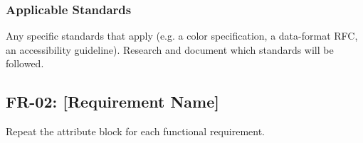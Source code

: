 \subsubsection{Applicable Standards}
Any specific standards that apply (e.g. a color specification, a data-format RFC, an accessibility guideline). Research and document which standards will be followed.

\subsection{FR-02: [Requirement Name]}
Repeat the attribute block for each functional requirement.
